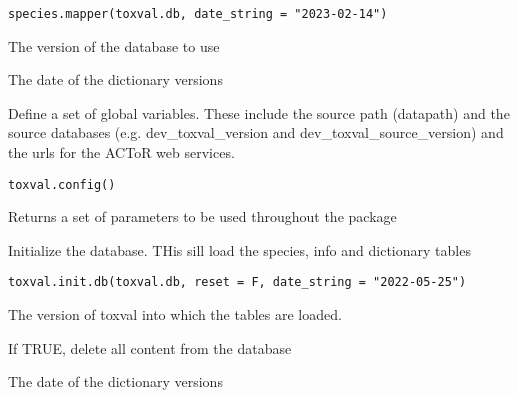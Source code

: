 \documentclass[letterpaper]{book}
\begin{document}
%
\begin{Usage}
\begin{verbatim}
species.mapper(toxval.db, date_string = "2023-02-14")
\end{verbatim}
\end{Usage}
%
\begin{Arguments}
\begin{ldescription}
\item[\code{toxval.db}] The version of the database to use

\item[\code{date\_string}] The date of the dictionary versions
\end{ldescription}
\end{Arguments}
%
\begin{Description}\relax
Define a set of global variables. These include the source path (datapath)
and the source databases (e.g. dev\_toxval\_version and dev\_toxval\_source\_version)
and the urls for the ACToR web services.
\end{Description}
%
\begin{Usage}
\begin{verbatim}
toxval.config()
\end{verbatim}
\end{Usage}
%
\begin{Value}
Returns a set of parameters to be used throughout the package
\end{Value}
%
\begin{Description}\relax
Initialize the database. THis sill load the species, info and dictionary tables
\end{Description}
%
\begin{Usage}
\begin{verbatim}
toxval.init.db(toxval.db, reset = F, date_string = "2022-05-25")
\end{verbatim}
\end{Usage}
%
\begin{Arguments}
\begin{ldescription}
\item[\code{toxval.db}] The version of toxval into which the tables are loaded.

\item[\code{reset}] If TRUE, delete all content from the database

\item[\code{date\_string}] The date of the dictionary versions
\end{ldescription}
\end{Arguments}
\end{document}
